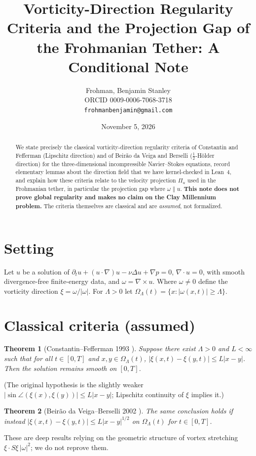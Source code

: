 \documentclass[11pt]{article}
\title{Vorticity-Direction Regularity Criteria and the Projection Gap of the Frohmanian Tether: A Conditional Note}
\author{Frohman, Benjamin Stanley\\ ORCID 0009-0006-7068-3718 \\ \texttt{frohmanbenjamin@gmail.com}}
\date{November 5, 2026}
\newtheorem{theorem}{Theorem}\newtheorem{lemma}[theorem]{Lemma}
\theoremstyle{definition}\newtheorem{definition}[theorem]{Definition}\newtheorem{remark}[theorem]{Remark}
\begin{document}
\maketitle
\begin{abstract}
We state precisely the classical vorticity-direction regularity criteria of Constantin and Fefferman (Lipschitz direction) and of Beir\~ao da Veiga and Berselli ($\tfrac12$-H\"older direction) for the three-dimensional incompressible Navier--Stokes equations, record elementary lemmas about the direction field that we have kernel-checked in Lean~4, and explain how these criteria relate to the velocity projection $\Pi_u$ used in the Frohmanian tether, in particular the projection gap where $\omega\parallel u$. \textbf{This note does not prove global regularity and makes no claim on the Clay Millennium problem.} The criteria themselves are classical and are \emph{assumed}, not formalized.
\end{abstract}

\section{Setting}
Let $u$ be a solution of $\partial_t u+(u\cdot\nabla)u-\nu\Delta u+\nabla p=0$, $\nabla\cdot u=0$, with smooth divergence-free finite-energy data, and $\omega=\nabla\times u$. Where $\omega\neq0$ define the vorticity direction $\xi=\omega/|\omega|$. For $\Lambda>0$ let $\Omega_\Lambda(t)=\{x:|\omega(x,t)|\ge\Lambda\}$.

\section{Classical criteria (assumed)}
\begin{theorem}[Constantin--Fefferman 1993 \cite{CF}]
Suppose there exist $\Lambda>0$ and $L<\infty$ such that for all $t\in[0,T]$ and $x,y\in\Omega_\Lambda(t)$,
$|\xi(x,t)-\xi(y,t)|\le L|x-y|$. Then the solution remains smooth on $[0,T]$.
\end{theorem}
(The original hypothesis is the slightly weaker $|\sin\angle(\xi(x),\xi(y))|\le L|x-y|$; Lipschitz continuity of $\xi$ implies it.)
\begin{theorem}[Beir\~ao da Veiga--Berselli 2002 \cite{BB}]
The same conclusion holds if instead $|\xi(x,t)-\xi(y,t)|\le L|x-y|^{1/2}$ on $\Omega_\Lambda(t)$ for $t\in[0,T]$.
\end{theorem}
These are deep results relying on the geometric structure of vortex stretching $\xi\cdot S\xi\,|\omega|^2$; we do not reprove them.
\end{document}
